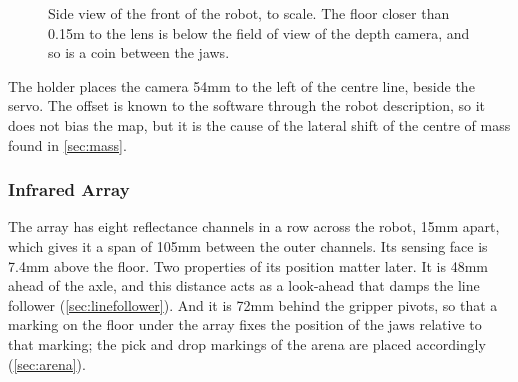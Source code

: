 \begin{figure}[htbp]
  \centering
  \caption{Side view of the front of the robot, to scale. The floor closer than 0.15\unit{m}
  to the lens is below the field of view of the depth camera, and so is a coin between the
  jaws.}
  \label{fig:blind}
\end{figure}

The holder places the camera 54\unit{mm} to the left of the centre line, beside the servo.
The offset is known to the software through the robot description, so it does not bias the
map, but it is the cause of the lateral shift of the centre of mass found in \cref{sec:mass}.

\subsubsection{Infrared Array}
The array has eight reflectance channels in a row across the robot, 15\unit{mm} apart, which
gives it a span of 105\unit{mm} between the outer channels. Its sensing face is 7.4\unit{mm}
above the floor. Two properties of its position matter later. It is 48\unit{mm} ahead of the
axle, and this distance acts as a look-ahead that damps the line follower
(\cref{sec:linefollower}). And it is 72\unit{mm} behind the gripper pivots, so that a marking
on the floor under the array fixes the position of the jaws relative to that marking; the
pick and drop markings of the arena are placed accordingly (\cref{sec:arena}).

